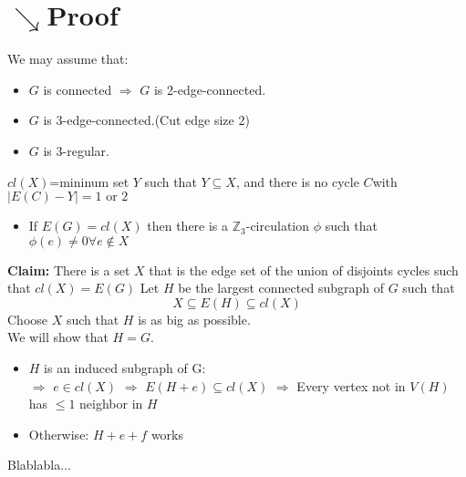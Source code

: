     \section{$\searrow$Proof}
        We may assume that:
        \begin{itemize}
            \item $G$ is connected $\Rightarrow$ $G$ is 2-edge-connected.\\
            \item $G$ is 3-edge-connected.(Cut edge size 2)
            \item $G$ is 3-regular.
        \end{itemize}
        $cl(X)$=mininum set $Y$ such that $Y\subseteq X$, and there is no cycle $C$with $|E(C)-Y|=1\text{ or }2$
        \begin{itemize}
            \item If $E(G)=cl(X)$ then there is a $\mathbb{Z}_3$-circulation $\phi$ such that $\phi(e)\neq 0 \forall e\notin X$
        \end{itemize}
        \textbf{Claim:} There is a set $X$ that is the edge set of the union of disjoints cycles such that $cl(X)=E(G)$
        Let $H$ be the largest connected subgraph of $G$ such that
        \[
            X\subseteq E(H)\subseteq cl(X)
        \]
        Choose $X$ such that $H$ is as big as possible.\\
        We will show that $H=G$.
        \begin{itemize}
            \item $H$ is an induced subgraph of G:\\
                $\Rightarrow$ $e\in cl(X)$
                $\Rightarrow$ $E(H+e)\subseteq cl(X)$
                $\Rightarrow$ Every vertex not in $V(H)$ has $\leq 1$ neighbor in $H$
            \item Otherwise: $H+e+f$ works
        \end{itemize}
        Blablabla$\ldots$

